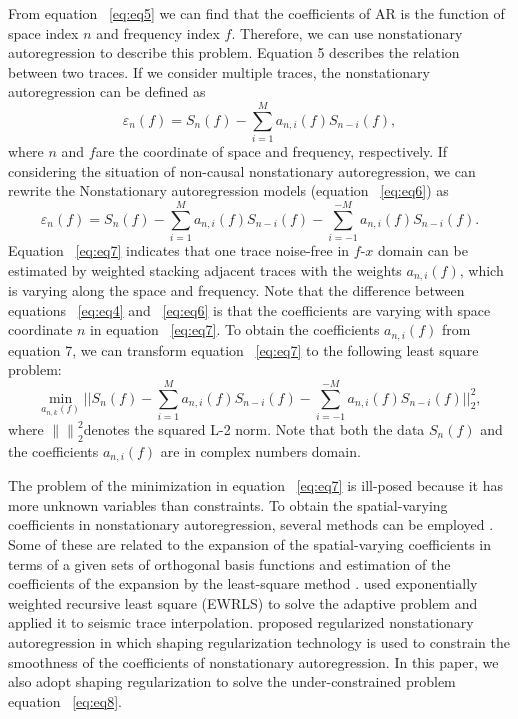 From equation ~\ref{eq:eq5} we can find that the coefficients of AR is the function of space index 
$n$ and frequency index $f$. Therefore, we can use nonstationary autoregression to 
describe this problem. Equation 5 describes the relation between two traces. 
If we consider multiple traces, the nonstationary autoregression can be defined as \cite[]{Fomel2009}
      \begin{equation}
         {{\varepsilon }_{n}}(f)={{S}_{n}}(f)-\sum\limits_{i=1}^{M}{{{a}_{n,i}}(f){{S}_{n-i}}(f)},
        \label{eq:eq6}
      \end{equation} 
where $n$ and $f$are the coordinate of space and frequency, respectively. If considering the situation
 of non-causal nonstationary autoregression, we can rewrite the Nonstationary autoregression models
 (equation ~\ref{eq:eq6}) as
      \begin{equation}
          {{\varepsilon }_{n}}(f)={{S}_{n}}(f)-\sum\limits_{i=1}^{M}{{{a}_{n,i}}(f){{S}_{n-i}}(f)}-\sum\limits_{i=-1}^{-M}{{{a}_{n,i}}(f){{S}_{n-i}}(f)}.
        \label{eq:eq7}
      \end{equation}
Equation ~\ref{eq:eq7} indicates that one trace noise-free in $f$-$x$ domain can 
be estimated by weighted stacking adjacent traces with the weights ${{a}_{n,i}}(f)$, 
which is varying along the space and frequency. Note that the difference between equations ~\ref{eq:eq4} and ~\ref{eq:eq6}
 is that the coefficients are varying with space coordinate $n$ in equation ~\ref{eq:eq7}. 
To obtain the coefficients ${{a}_{n,i}}(f)$ from equation 7, we can transform equation ~\ref{eq:eq7} 
to the following least square problem:
      \begin{equation}
          \min_{a_{n,k}(f)}||{{S}_{n}}(f)-\sum\limits_{i=1}^{M}{{{a}_{n,i}}(f){{S}_{n-i}}(f)}-\sum\limits_{i=-1}^{-M}{{{a}_{n,i}}(f){{S}_{n-i}}(f)}||_{2}^{2},
        \label{eq:eq8}
      \end{equation} 
where $\left\| {} \right\|_{2}^{2}$denotes the squared L-2 norm. Note that both the data 
${{S}_{n}}(f)$ and the coefficients ${{a}_{n,i}}(f)$ are in complex numbers domain.

The problem of the minimization in equation ~\ref{eq:eq7} is ill-posed because it 
has more unknown variables than constraints. To obtain the spatial-varying coefficients
in nonstationary autoregression, several methods can be employed \cite[]{Aboutajdine1996}. 
Some of these are related to the expansion of the spatial-varying coefficients in terms of a
given sets of orthogonal basis functions and estimation of the coefficients of the expansion 
by the least-square method \cite[]{Izquierdo2006}. \cite{Naghizadeh2009} used exponentially 
weighted recursive least square (EWRLS) to solve the adaptive problem and applied it to 
seismic trace interpolation. \cite{Fomel2009} proposed regularized nonstationary autoregression 
in which shaping regularization technology \cite[]{Fomel2007} is used to constrain the 
smoothness of the coefficients of nonstationary autoregression. In this paper, we also adopt
shaping regularization to solve the under-constrained problem equation ~\ref{eq:eq8}.
 
